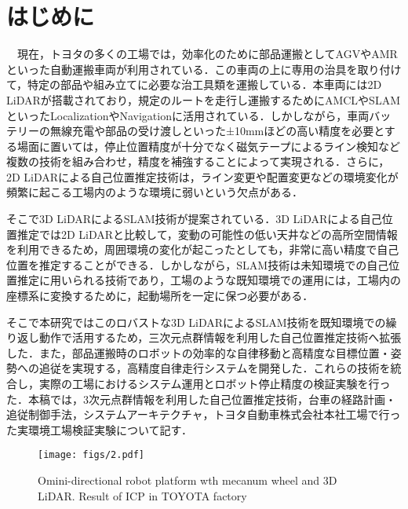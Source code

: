 \section{はじめに}
　現在，トヨタの多くの工場では，効率化のために部品運搬としてAGVやAMRといった自動運搬車両が利用されている．この車両の上に専用の治具を取り付けて，特定の部品や組み立てに必要な治工具類を運搬している．本車両には2D LiDARが搭載されており，規定のルートを走行し運搬するためにAMCLやSLAM\cite{2d-AMCL, 2d-SLAM}といったLocalizationやNavigationに活用されている．しかしながら，車両バッテリーの無線充電や部品の受け渡しといった±10mmほどの高い精度を必要とする場面に置いては，停止位置精度が十分でなく磁気テープによるライン検知など複数の技術を組み合わせ，精度を補強することによって実現される．さらに，2D LiDARによる自己位置推定技術は，ライン変更や配置変更などの環境変化が頻繁に起こる工場内のような環境に弱いという欠点がある．

そこで3D LiDARによるSLAM技術が提案されている\cite{6DSLAM_outside, 3D_SLAM_outside, EKF_SLAM, FAST-LIO, FAST-LIO2}．3D LiDARによる自己位置推定では2D LiDARと比較して，変動の可能性の低い天井などの高所空間情報を利用できるため，周囲環境の変化が起こったとしても，非常に高い精度で自己位置を推定することができる．しかしながら，SLAM技術は未知環境での自己位置推定に用いられる技術であり，工場のような既知環境での運用には，工場内の座標系に変換するために，起動場所を一定に保つ必要がある．

そこで本研究ではこのロバストな3D LiDARによるSLAM技術を既知環境での繰り返し動作で活用するため，三次元点群情報を利用した自己位置推定技術へ拡張した．また，部品運搬時のロボットの効率的な自律移動と高精度な目標位置・姿勢への追従を実現する，高精度自律走行システムを開発した．これらの技術を統合し，実際の工場におけるシステム運用とロボット停止精度の検証実験を行った．本稿では，3次元点群情報を利用した自己位置推定技術，台車の経路計画・追従制御手法，システムアーキテクチャ，トヨタ自動車株式会社本社工場で行った実環境工場検証実験について記す．

\begin{figure}[!t]
\texttt{[image: figs/2.pdf]}
\caption{Omini-directional robot platform wth mecanum wheel and 3D LiDAR. Result of ICP in TOYOTA factory}
\label{fig:fig2}
\end{figure}
